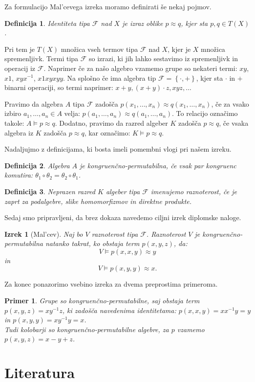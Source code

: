 \documentclass[a4paper,11pt]{article}
\newtheorem{izrek}{Izrek}
\newtheorem{definicija}{Definicija}
\newtheorem{primer}{Primer}
\begin{document}
Za formulacijo Mal'cevega izreka moramo definirati še nekaj pojmov. 
\begin{definicija}
    \emph{Identiteta} tipa $\mathcal{F}$ nad $X$ je izraz oblike $p \approx q$, kjer sta $p, q \in T\left(X\right)$.
\end{definicija}
Pri tem je $T\left(X\right)$ množica vseh termov tipa $\mathcal{F}$ nad $X$, kjer je $X$ množica spremenljivk. Termi 
tipa $\mathcal{F}$ so izrazi, ki jih lahko sestavimo iz spremenljivk in operacij iz $\mathcal{F}$. Naprimer če za našo 
algebro vzamemo grupe so nekateri termi: $xy$, $x1$, $xyx^{-1}$, $x1xyxyy$. Na splošno če ima algebra tip $\mathcal{F} =
\left\{\cdot, +\right\}$, kjer sta $\cdot$ in $+$ binarni operaciji, so termi naprimer: $x+y, (x+y) \cdot z, xyz, \ldots$

Pravimo da algebra $A$ tipa $\mathcal{F}$ zadošča $p\left(x_1, \ldots, x_n\right)\approx q\left(x_1, \ldots, x_n\right)$,
če za vsako izbiro $a_1, \ldots, a_n \in A$ velja: $p\left(a_1, \ldots, a_n\right) \approx q\left(a_1, 
\ldots, a_n\right)$. To relacijo označimo takole: $A \models p \approx q$. Dodatno, pravimo da razred algeber $K$ 
zadošča $p \approx q$, če vsaka algebra iz $K$ zadošča $p \approx q$, kar označimo: $K \models p \approx q$.

Nadaljujmo z definicijama, ki bosta imeli pomembni vlogi pri našem izreku.

\begin{definicija}
    Algebra $A$ je \emph{kongruenčno-permutabilna}, če vsak par kongruenc komutira: $\theta_1 \circ \theta_2 =
    \theta_2 \circ \theta_1$. 
\end{definicija}

\begin{definicija}
    Neprazen razred $K$ algeber tipa $\mathcal{F}$ imenujemo \emph{raznoterost}, če je zaprt za podalgebre, 
    slike homomorfizmov in direktne produkte.
\end{definicija}

Sedaj smo pripravljeni, da brez dokaza navedemo ciljni izrek diplomske naloge.

\begin{izrek}[Mal'cev] Naj bo $V$ raznoterost tipa $\mathcal{F}$. Raznoterost $V$ je kongruenčno-permutabilna
    natanko takrat, ko obstaja term $p\left(x, y, z\right)$, da: \\ $$V \models p\left(x,x,y\right)\approx y$$ 
    in $$V \models p\left(x,y,y\right)\approx x.$$   
\end{izrek}

Za konec ponazorimo vsebino izreka za dvema preprostima primeroma.

\begin{primer}
    Grupe so kongruenčno-permutabilne, saj obstaja term $p(x,y,z)=xy^{-1}z$, ki zadošča navedenima identitetama:
    $p(x,x,y)= xx^{-1}y=y$ in $p(x, y, y)=xy^{-1}y=x$.\\
    Tudi kolobarji so kongruenčno-permutabilne algebre, za $p$ vzamemo $p(x,y,z)= x-y+z$.
\end{primer}

\section{Literatura}

\end{document}
